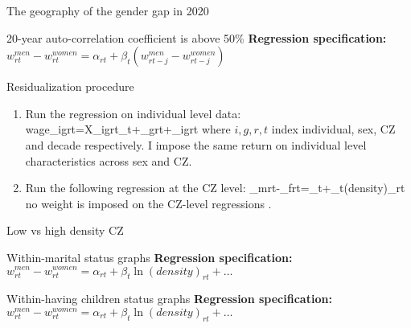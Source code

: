 \begin{frame}{The geography of the gender gap in 2020}
\label{slide:map}


\end{frame}

\begin{frame}{20-year auto-correlation coefficient is above 50\%} 
	\label{slide:persistence}
	\textbf{\alert{Regression specification:}} $w^{men}_{rt}-w^{women}_{rt}=\alpha_{rt}+\beta_{t}(w^{men}_{rt-j}-w^{women}_{rt-j})$
	
\end{frame}
\begin{frame}{Residualization procedure}
	\label{slide:residual}
	\begin{enumerate}
		\item Run the regression on \alert{individual} level data:
		\beqns
			wage_{igrt}=X_{igrt}\gamma_t+\lambda_{grt}+\varepsilon_{igrt}
		\eeqns
		where $i,g,r,t$ index individual, sex, CZ and decade respectively. I impose the \alert{same} return on individual level characteristics across sex and CZ.
		\item Run the following regression at the CZ level:
		\beqns
			\lambda_{mrt}-\lambda_{frt}=\alpha_t+\beta_{t}\ln(density)_{rt}
		\eeqns
		no weight is imposed on the CZ-level regressions \citep{Solon2015a}.
	\end{enumerate}
\end{frame}

\begin{frame}{Low vs high density CZ}
	\label{slide:distribution}
	
\end{frame}


\begin{frame}{Within-marital status graphs}
	\label{slide:married}
	\textbf{\alert{Regression specification:}}	$w^{men}_{rt}-w^{women}_{rt}=\alpha_{rt}+\beta_{t}\ln(density)_{rt}+ \dots$
	
\end{frame}

\begin{frame}{Within-having children status graphs}
	\label{slide:has_children}
	\textbf{\alert{Regression specification:}}	$w^{men}_{rt}-w^{women}_{rt}=\alpha_{rt}+\beta_{t}\ln(density)_{rt}+ \dots$
	
\end{frame}


